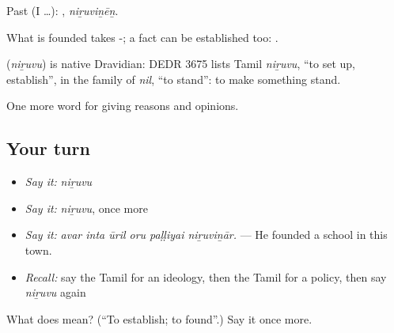 Past (I …): , \emph{niṟuviṉēṉ}.

What is founded takes -; a fact can be established too:  .

\begin{cousinweb}
\textbf{} (\emph{niṟuvu}) is native Dravidian: DEDR 3675 lists Tamil \emph{niṟuvu}, \textquotedblleft{}to set up, establish\textquotedblright{}, in the family of \emph{nil}, \textquotedblleft{}to stand\textquotedblright{}: to make something stand.
\end{cousinweb}

\begin{grammarlens}[title={What you've built}]
One more word for giving reasons and opinions.
\end{grammarlens}

\subsection*{Your turn}
\begin{itemize}
\raggedright
  \item \emph{Say it:} \emph{niṟuvu}
  \item \emph{Say it:} \emph{niṟuvu}, once more
  \item \emph{Say it:} \emph{avar inta ūril oru paḷḷiyai niṟuviṉār.} — He founded a school in this town.
  \item \emph{Recall:} say the Tamil for an ideology, then the Tamil for a policy, then say \emph{niṟuvu} again
\end{itemize}

\begin{tcolorbox}[breakable,colback=teal!4,colframe=teal!35!black,title={Before you move on}]
What does  mean? (\textquotedblleft{}To establish; to found\textquotedblright{}.) Say it once more.
\end{tcolorbox}
